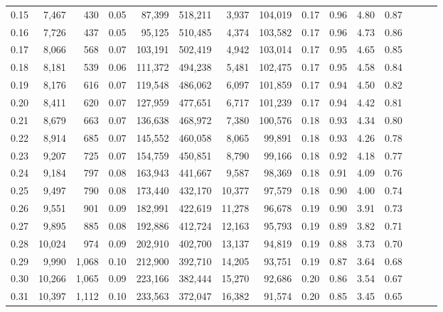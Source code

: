 \begin{tabular}{rrrrrrrrrrrrrrr}
0.15 &   7,467 &    430 &  0.05 &   87,399 &  518,211 &    3,937 &  104,019 &  0.17 &  0.96 &  4.80 &      0.87 \\
0.16 &   7,726 &    437 &  0.05 &   95,125 &  510,485 &    4,374 &  103,582 &  0.17 &  0.96 &  4.73 &      0.86 \\
0.17 &   8,066 &    568 &  0.07 &  103,191 &  502,419 &    4,942 &  103,014 &  0.17 &  0.95 &  4.65 &      0.85 \\
0.18 &   8,181 &    539 &  0.06 &  111,372 &  494,238 &    5,481 &  102,475 &  0.17 &  0.95 &  4.58 &      0.84 \\
0.19 &   8,176 &    616 &  0.07 &  119,548 &  486,062 &    6,097 &  101,859 &  0.17 &  0.94 &  4.50 &      0.82 \\
0.20 &   8,411 &    620 &  0.07 &  127,959 &  477,651 &    6,717 &  101,239 &  0.17 &  0.94 &  4.42 &      0.81 \\
0.21 &   8,679 &    663 &  0.07 &  136,638 &  468,972 &    7,380 &  100,576 &  0.18 &  0.93 &  4.34 &      0.80 \\
0.22 &   8,914 &    685 &  0.07 &  145,552 &  460,058 &    8,065 &   99,891 &  0.18 &  0.93 &  4.26 &      0.78 \\
0.23 &   9,207 &    725 &  0.07 &  154,759 &  450,851 &    8,790 &   99,166 &  0.18 &  0.92 &  4.18 &      0.77 \\
0.24 &   9,184 &    797 &  0.08 &  163,943 &  441,667 &    9,587 &   98,369 &  0.18 &  0.91 &  4.09 &      0.76 \\
0.25 &   9,497 &    790 &  0.08 &  173,440 &  432,170 &   10,377 &   97,579 &  0.18 &  0.90 &  4.00 &      0.74 \\
0.26 &   9,551 &    901 &  0.09 &  182,991 &  422,619 &   11,278 &   96,678 &  0.19 &  0.90 &  3.91 &      0.73 \\
0.27 &   9,895 &    885 &  0.08 &  192,886 &  412,724 &   12,163 &   95,793 &  0.19 &  0.89 &  3.82 &      0.71 \\
0.28 &  10,024 &    974 &  0.09 &  202,910 &  402,700 &   13,137 &   94,819 &  0.19 &  0.88 &  3.73 &      0.70 \\
0.29 &   9,990 &  1,068 &  0.10 &  212,900 &  392,710 &   14,205 &   93,751 &  0.19 &  0.87 &  3.64 &      0.68 \\
0.30 &  10,266 &  1,065 &  0.09 &  223,166 &  382,444 &   15,270 &   92,686 &  0.20 &  0.86 &  3.54 &      0.67 \\
0.31 &  10,397 &  1,112 &  0.10 &  233,563 &  372,047 &   16,382 &   91,574 &  0.20 &  0.85 &  3.45 &      0.65 \\

\end{tabular}
